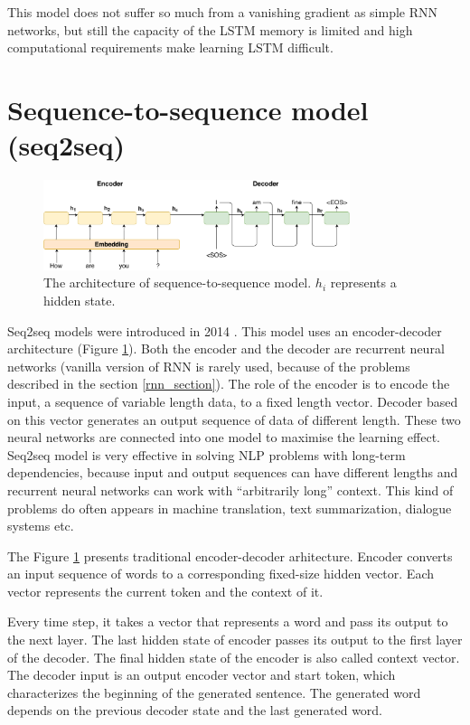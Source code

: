 This model does not suffer so much from a vanishing gradient as simple RNN networks, but still the capacity of the LSTM memory is limited and high computational requirements make learning LSTM difficult. 

\section{Sequence-to-sequence model (seq2seq)} \label{seq2seq_section}

\begin{figure}[hbt]
  \centering
  \includegraphics[width=0.8\textwidth]{figures/encoder_decoder.pdf}
  \caption{The architecture of sequence-to-sequence model. $h_i$ represents a hidden state.}
  \label{encoder_decoder}
\end{figure}

Seq2seq models were introduced in 2014 \cite{sutskever2014sequence}. This model uses an encoder-decoder architecture (Figure \ref{encoder_decoder}). Both the encoder and the decoder are recurrent neural networks (vanilla version of RNN is rarely used, because of the problems described in the section \ref{rnn_section}). The role of the encoder is to encode the input, a sequence of variable length data, to a fixed length vector. Decoder based on this vector generates an output sequence of data of different length. These two neural networks are connected into one model to maximise the learning effect. Seq2seq model is very effective in solving NLP problems with long-term dependencies, because input and output sequences can have different lengths and recurrent neural networks can work with ``arbitrarily long'' context. This kind of problems do often appears in machine translation, text summarization, dialogue systems etc.

The Figure \ref{encoder_decoder} presents traditional encoder-decoder arhitecture. Encoder converts an input sequence of words to a corresponding fixed-size hidden vector. Each vector represents the current token and the context of it. 

Every time step, it takes a vector that represents a word and pass its output to the next layer. The last hidden state of encoder passes its output to the first layer of the decoder. The final hidden state of the encoder is also called context vector. The decoder input is an output encoder vector and start token, which characterizes the beginning of the generated sentence. The generated word depends on the previous decoder state and the last generated word.


